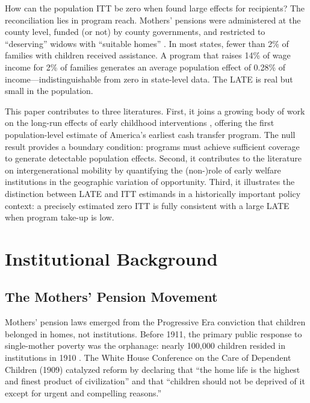 \documentclass[12pt]{article}
\begin{document}
How can the population ITT be zero when \citet{aizer2016} found large effects for recipients? The reconciliation lies in program reach. Mothers' pensions were administered at the county level, funded (or not) by county governments, and restricted to ``deserving'' widows with ``suitable homes'' \citep{thompson1919}. In most states, fewer than 2\% of families with children received assistance. A program that raises 14\% of wage income for 2\% of families generates an average population effect of 0.28\% of income---indistinguishable from zero in state-level data. The LATE is real but small in the population.

This paper contributes to three literatures. First, it joins a growing body of work on the long-run effects of early childhood interventions \citep{heckman2010, hoynes2016, duflo2001}, offering the first population-level estimate of America's earliest cash transfer program. The null result provides a boundary condition: programs must achieve sufficient coverage to generate detectable population effects. Second, it contributes to the literature on intergenerational mobility \citep{chetty2014, derenoncourt2022} by quantifying the (non-)role of early welfare institutions in the geographic variation of opportunity. Third, it illustrates the distinction between LATE and ITT estimands \citep{imbens2004} in a historically important policy context: a precisely estimated zero ITT is fully consistent with a large LATE when program take-up is low.


\section{Institutional Background}

\subsection{The Mothers' Pension Movement}

Mothers' pension laws emerged from the Progressive Era conviction that children belonged in homes, not institutions. Before 1911, the primary public response to single-mother poverty was the orphanage: nearly 100,000 children resided in institutions in 1910 \citep{skocpol1992}. The White House Conference on the Care of Dependent Children (1909) catalyzed reform by declaring that ``the home life is the highest and finest product of civilization'' and that ``children should not be deprived of it except for urgent and compelling reasons.''
\end{document}
